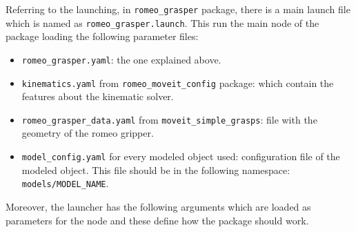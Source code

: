 \documentclass[12pt,a4paper,final,twoside,openright]{report}
\begin{document}
%
%

\vspace{-5pt}
Referring to the launching, in \texttt{romeo\_grasper} package, there is a main launch file which is named as \texttt{romeo\_grasper.launch}. This run the main node of the package loading the following parameter files:

\begin{itemize}
\item \texttt{romeo\_grasper.yaml}: the one explained above.
\item \texttt{kinematics.yaml} from \texttt{romeo\_moveit\_config} package: which contain the features about the kinematic solver.
\item \texttt{romeo\_grasper\_data.yaml} from \texttt{moveit\_simple\_grasps}: file with the geometry of the romeo gripper. 
\item \texttt{model\_config.yaml} for every modeled object used: configuration file of the modeled object. This file should be in the following namespace: \texttt{models/MODEL\_NAME}.
\end{itemize}

Moreover, the launcher has the following arguments which are loaded as parameters for the node and these define how the package should work.
\end{document}
